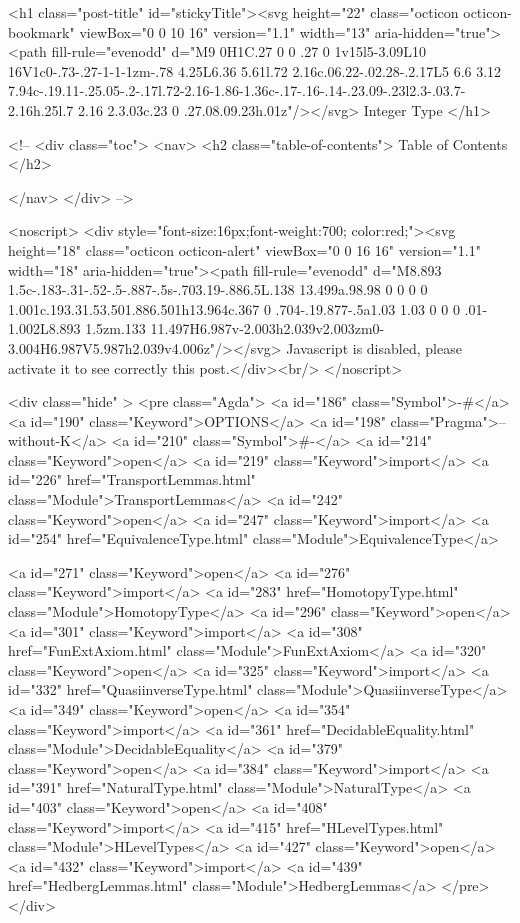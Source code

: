   <h1 class="post-title" id="stickyTitle"><svg height="22" class="octicon octicon-bookmark" viewBox="0 0 10 16" version="1.1" width="13" aria-hidden="true"><path fill-rule="evenodd" d="M9 0H1C.27 0 0 .27 0 1v15l5-3.09L10 16V1c0-.73-.27-1-1-1zm-.78 4.25L6.36 5.61l.72 2.16c.06.22-.02.28-.2.17L5 6.6 3.12 7.94c-.19.11-.25.05-.2-.17l.72-2.16-1.86-1.36c-.17-.16-.14-.23.09-.23l2.3-.03.7-2.16h.25l.7 2.16 2.3.03c.23 0 .27.08.09.23h.01z"/></svg> Integer Type
  </h1>

  <!-- 
  <div class="toc">
    <nav>
    <h2 class="table-of-contents"> Table of Contents </h2>
      

    </nav>
  </div>
   -->

  <noscript>
  <div style="font-size:16px;font-weight:700; color:red;"><svg height="18" class="octicon octicon-alert" viewBox="0 0 16 16" version="1.1" width="18" aria-hidden="true"><path fill-rule="evenodd" d="M8.893 1.5c-.183-.31-.52-.5-.887-.5s-.703.19-.886.5L.138 13.499a.98.98 0 0 0 0 1.001c.193.31.53.501.886.501h13.964c.367 0 .704-.19.877-.5a1.03 1.03 0 0 0 .01-1.002L8.893 1.5zm.133 11.497H6.987v-2.003h2.039v2.003zm0-3.004H6.987V5.987h2.039v4.006z"/></svg> Javascript is disabled, please activate it to see correctly this post.</div><br/>
  </noscript>

  <div class="hide" >
<pre class="Agda">
<a id="186" class="Symbol">{-#</a> <a id="190" class="Keyword">OPTIONS</a> <a id="198" class="Pragma">--without-K</a> <a id="210" class="Symbol">#-}</a>
<a id="214" class="Keyword">open</a> <a id="219" class="Keyword">import</a> <a id="226" href="TransportLemmas.html" class="Module">TransportLemmas</a>
<a id="242" class="Keyword">open</a> <a id="247" class="Keyword">import</a> <a id="254" href="EquivalenceType.html" class="Module">EquivalenceType</a>

<a id="271" class="Keyword">open</a> <a id="276" class="Keyword">import</a> <a id="283" href="HomotopyType.html" class="Module">HomotopyType</a>
<a id="296" class="Keyword">open</a> <a id="301" class="Keyword">import</a> <a id="308" href="FunExtAxiom.html" class="Module">FunExtAxiom</a>
<a id="320" class="Keyword">open</a> <a id="325" class="Keyword">import</a> <a id="332" href="QuasiinverseType.html" class="Module">QuasiinverseType</a>
<a id="349" class="Keyword">open</a> <a id="354" class="Keyword">import</a> <a id="361" href="DecidableEquality.html" class="Module">DecidableEquality</a>
<a id="379" class="Keyword">open</a> <a id="384" class="Keyword">import</a> <a id="391" href="NaturalType.html" class="Module">NaturalType</a>
<a id="403" class="Keyword">open</a> <a id="408" class="Keyword">import</a> <a id="415" href="HLevelTypes.html" class="Module">HLevelTypes</a>
<a id="427" class="Keyword">open</a> <a id="432" class="Keyword">import</a> <a id="439" href="HedbergLemmas.html" class="Module">HedbergLemmas</a>
</pre>
</div>


